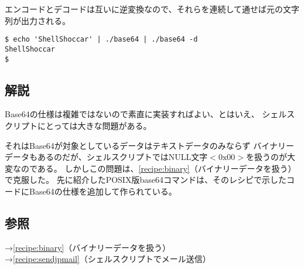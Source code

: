 エンコードとデコードは互いに逆変換なので、それらを連続して通せば元の文字列が出力される。
\begin{screen}
	\verb!$ echo 'ShellShoccar' | ./base64 | ./base64 -d! \return \\
	\verb|ShellShoccar|                                           \\
	\verb|$ |
\end{screen}

\subsection*{解説}

Base64の仕様は複雑ではないので素直に実装すればよい、とはいえ、
シェルスクリプトにとっては大きな問題がある。

それはBase64が対象としているデータはテキストデータのみならず
バイナリーデータもあるのだが、シェルスクリプトではNULL文字$<\mathrm{0x00}>$を扱うのが大変なのである。
しかしこの問題は、\ref{recipe:binary}（バイナリーデータを扱う）で克服した。
先に紹介したPOSIX版base64コマンドは、そのレシピで示したコードにBase64の仕様を追加して作られている。

\subsection*{参照}

\noindent
→\ref{recipe:binary}（バイナリーデータを扱う） \\
→\ref{recipe:sendjpmail}（シェルスクリプトでメール送信）
